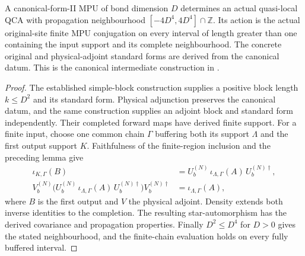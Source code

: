 \begin{lemma}
    \label{lem:mpu_actual_qca_canonical}
    \leanok
    A canonical-form-II MPU of bond dimension $D$ determines an actual
    quasi-local QCA with propagation neighbourhood
    $[-4D^4,4D^4]\cap\mathbb Z$. Its action is the actual original-site
    finite MPU conjugation on every interval of length greater than
    one containing the input support and its complete neighbourhood.
    The concrete original and physical-adjoint standard forms are
    derived from the canonical datum. This is the canonical
    intermediate construction in
    \cite[lines~378--427, 563--622 and~2292--2306]{Cirac2017MPU}.
\end{lemma}
\begin{proof}
    \leanok
    The established simple-block construction supplies a positive block
    length $k\le D^2$ and its standard form. Physical adjunction
    preserves the canonical datum, and the same construction supplies
    an adjoint block and standard form independently. Their completed
    forward maps have derived finite support. For a finite input,
    choose one common chain $\Gamma$ buffering both its support
    $\Lambda$ and the first output support $K$. Faithfulness of the
    finite-region inclusion and the preceding lemma give
    \begin{align}
        \iota_{K,\Gamma}(B)
         & =U_b^{(N)}\,\iota_{\Lambda,\Gamma}(A)\,U_b^{(N)\dagger},
        \\
        V_b^{(N)}\bigl(U_b^{(N)}\,\iota_{\Lambda,\Gamma}(A)\,
        U_b^{(N)\dagger}\bigr)V_b^{(N)\dagger}
         & =\iota_{\Lambda,\Gamma}(A),
        \label{eq:mpu_actual_qca_buffered_cancellation}
    \end{align}
    where $B$ is the first output and $V$ the physical adjoint.
    Density extends both inverse identities to the completion. The
    resulting star-automorphism has the derived covariance and
    propagation properties. Finally $D^2\le D^4$ for $D>0$ gives the
    stated neighbourhood, and the finite-chain evaluation
    holds on every fully buffered interval.
\end{proof}

